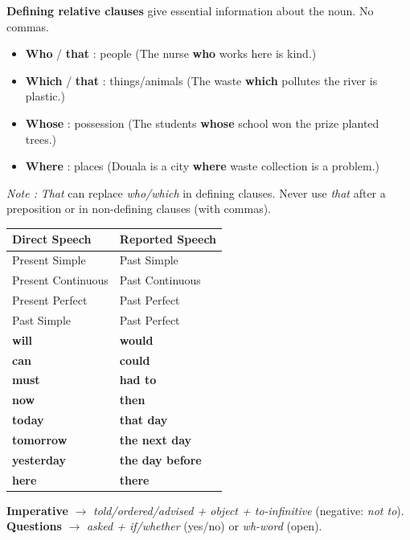 \documentclass[11pt]{article}
\begin{document}
\begin{aretenir}
\textbf{Defining relative clauses} give essential information about the noun. No commas.
\begin{itemize}
\item \textbf{Who} / \textbf{that} : people (The nurse \textbf{who} works here is kind.)
\item \textbf{Which} / \textbf{that} : things/animals (The waste \textbf{which} pollutes the river is plastic.)
\item \textbf{Whose} : possession (The students \textbf{whose} school won the prize planted trees.)
\item \textbf{Where} : places (Douala is a city \textbf{where} waste collection is a problem.)
\end{itemize}
\textit{Note :} \emph{That} can replace \emph{who/which} in defining clauses. Never use \emph{that} after a preposition or in non-defining clauses (with commas).
\end{aretenir}

\begin{aretenir}
\begin{center}
\begin{tabularx}{\linewidth}{|l|X|}\hline
\textbf{Direct Speech} & \textbf{Reported Speech} \\ \hline
Present Simple & Past Simple \\
Present Continuous & Past Continuous \\
Present Perfect & Past Perfect \\
Past Simple & Past Perfect \\
\textbf{will} & \textbf{would} \\
\textbf{can} & \textbf{could} \\
\textbf{must} & \textbf{had to} \\
\textbf{now} & \textbf{then} \\
\textbf{today} & \textbf{that day} \\
\textbf{tomorrow} & \textbf{the next day} \\
\textbf{yesterday} & \textbf{the day before} \\
\textbf{here} & \textbf{there} \\ \hline
\end{tabularx}
\end{center}
\textbf{Imperative} $\to$ \emph{told/ordered/advised + object + to-infinitive} (negative: \emph{not to}).
\textbf{Questions} $\to$ \emph{asked + if/whether} (yes/no) or \emph{wh-word} (open).
\end{aretenir}
\end{document}
